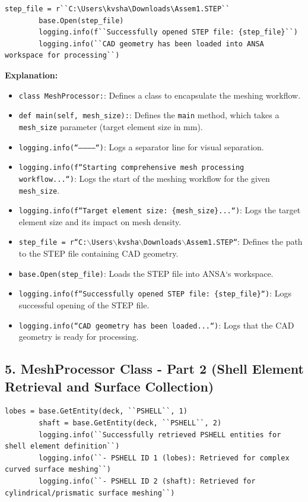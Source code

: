 \documentclass{book}
\begin{document}
\begin{itemize}[leftmargin=*,label=\textbullet]
\begin{lstlisting}[caption={MeshProcessor Class - Initial Steps},label={lst:meshprocessor_1}]
        step_file = r``C:\Users\kvsha\Downloads\Assem1.STEP``
        base.Open(step_file)
        logging.info(f``Successfully opened STEP file: {step_file}``)
        logging.info(``CAD geometry has been loaded into ANSA workspace for processing``)
\end{lstlisting}
\textbf{Explanation:}
\begin{itemize}
    \item \texttt{class MeshProcessor:}: Defines a class to encapsulate the meshing workflow.
    \item \texttt{def main(self, mesh\_size):}: Defines the \texttt{main} method, which takes a \texttt{mesh\_size} parameter (target element size in mm).
    \item \texttt{logging.info(``-----------``)}: Logs a separator line for visual separation.
    \item \texttt{logging.info(f``Starting comprehensive mesh processing workflow...``)}: Logs the start of the meshing workflow for the given \texttt{mesh\_size}.
    \item \texttt{logging.info(f``Target element size: \{mesh\_size\}...``)}: Logs the target element size and its impact on mesh density.
    \item \texttt{step\_file = r``C:$\backslash$Users$\backslash$kvsha$\backslash$Downloads$\backslash$Assem1.STEP``}: Defines the path to the STEP file containing CAD geometry.
    \item \texttt{base.Open(step\_file)}: Loads the STEP file into ANSA`s workspace.
    \item \texttt{logging.info(f``Successfully opened STEP file: \{step\_file\}``)}: Logs successful opening of the STEP file.
    \item \texttt{logging.info(``CAD geometry has been loaded...``)}: Logs that the CAD geometry is ready for processing.
\end{itemize}

\subsection*{5. MeshProcessor Class - Part 2 (Shell Element Retrieval and Surface Collection)}
\begin{lstlisting}[caption={MeshProcessor Class - Shell Element Retrieval},label={lst:meshprocessor_2}]
        lobes = base.GetEntity(deck, ``PSHELL``, 1)
        shaft = base.GetEntity(deck, ``PSHELL``, 2)
        logging.info(``Successfully retrieved PSHELL entities for shell element definition``)
        logging.info(``- PSHELL ID 1 (lobes): Retrieved for complex curved surface meshing``)
        logging.info(``- PSHELL ID 2 (shaft): Retrieved for cylindrical/prismatic surface meshing``)


\end{lstlisting}
\end{itemize}
\end{document}
